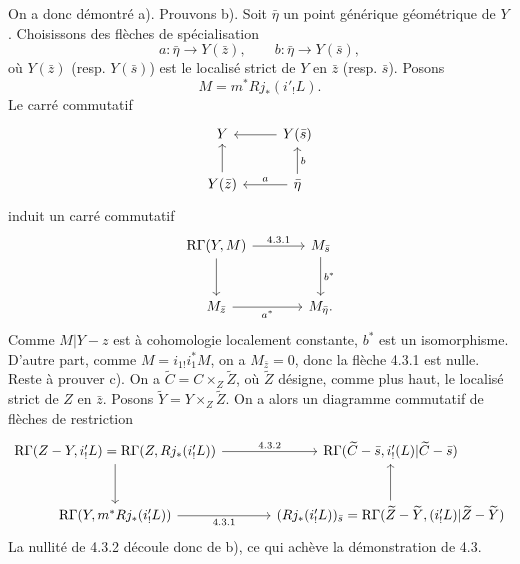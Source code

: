 \documentclass[11pt]{article}
\begin{document}
On a donc démontré a). Prouvons b). Soit $\bar\eta$ un point générique géométrique de $Y$. Choisissons des flèches de spécialisation
\[
a:\bar\eta\to Y(\bar z),\qquad b:\bar\eta\to Y(\bar s),
\]
où $Y(\bar z)$ (resp. $Y(\bar s)$) est le localisé strict de $Y$ en $\bar z$ (resp. $\bar s$). Posons
\[
M=m^*Rj_*(i'_!L).
\]
Le carré commutatif
\[
\begin{tikzcd}
Y & Y(\bar s)\arrow[l]\\
Y(\bar z)\arrow[u] & \bar\eta \arrow[l,"a"']\arrow[u,"b"']
\end{tikzcd}
\]
induit un carré commutatif
\[
\begin{tikzcd}[column sep=large,row sep=large]
\mathrm R\Gamma(Y,M) \arrow[r,"4.3.1"] \arrow[d] & M_{\bar s} \arrow[d,"b^*"]\\
M_{\bar z} \arrow[r,"a^*"'] & M_{\bar\eta}.
\end{tikzcd}
\]
Comme $M|Y-z$ est à cohomologie localement constante, $b^*$ est un isomorphisme. D'autre part, comme $M=i_{1!}i_1^*M$, on a $M_{\bar z}=0$, donc la flèche 4.3.1 est nulle. Reste à prouver c). On a $\widetilde C=C\times_Z\widetilde Z$, où $\widetilde Z$ désigne, comme plus haut, le localisé strict de $Z$ en $\bar z$. Posons $\widetilde Y=Y\times_Z\widetilde Z$. On a alors un diagramme commutatif de flèches de restriction
\[
\begin{tikzcd}[column sep=large,row sep=large]
\mathrm R\Gamma(Z-Y,i'_!L)=\mathrm R\Gamma(Z,Rj_*(i'_!L))
 \arrow[r,"4.3.2"] \arrow[d]
&
\mathrm R\Gamma(\widetilde C-\bar s,i'_!(L)|\widetilde C-\bar s)\\
\mathrm R\Gamma(Y,m^*Rj_*(i'_!L)) \arrow[r,"4.3.1"']
&
(Rj_*(i'_!L))_{\bar s}
  =\mathrm R\Gamma(\widetilde Z-\widetilde Y,(i'_!L)|\widetilde Z-\widetilde Y) \arrow[u]
\end{tikzcd}
\]
La nullité de 4.3.2 découle donc de b), ce qui achève la démonstration de 4.3.
\end{document}
